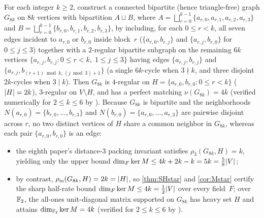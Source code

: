 \begin{remark}\label{rem:deg4-numerics}
For each integer $k \ge 2$, construct a connected bipartite (hence triangle-free) graph $G_{8k}$ on $8k$ vertices with
bipartition $A \sqcup B$, where $A = \bigsqcup_{r=0}^{k-1} \{a_{r,0}, a_{r,1}, a_{r,2}, a_{r,3}\}$ and
$B = \bigsqcup_{r=0}^{k-1} \{b_{r,0}, b_{r,1}, b_{r,2}, b_{r,3}\}$, by including, for each $0 \le r < k$, all seven edges
incident to $a_{r,0}$ or $b_{r,0}$ inside block~$r$ ($\{a_{r,0}, b_{r,j}\}$ and $\{a_{r,j}, b_{r,0}\}$ for $0 \le j \le 3$)
together with a $2$-regular bipartite subgraph on the remaining $6k$ vertices $\{a_{r,j}, b_{r,j} : 0 \le r < k,\; 1 \le j \le 3\}$
having edges $\{a_{r,j}, b_{r,j}\}$ and $\{a_{r,j}, b_{(r+1)\bmod k,\,(j\bmod 3)+1}\}$ (a single $6k$-cycle when $3 \nmid k$,
and three disjoint $2k$-cycles when $3 \mid k$). Then $G_{8k}$ is $4$-regular on $H = \{a_{r,0}, b_{r,0} : 0 \le r < k\}$
($\lvert H \rvert = 2k$), $3$-regular on $V \setminus H$, and has a perfect matching $\nu(G_{8k}) = 4k$ (verified numerically for
$2 \le k \le 6$ by ). Because $G_{8k}$ is bipartite and the neighborhoods
$N(a_{r,0}) = \{b_{r,0},\dots,b_{r,3}\}$ and $N(b_{r,0}) = \{a_{r,0},\dots,a_{r,3}\}$ are pairwise disjoint across $r$, no two
distinct vertices of $H$ share a common neighbor in $G_{8k}$, whereas each pair $\{a_{r,0}, b_{r,0}\}$ is an edge:
\begin{itemize}
\item the eighth paper's distance-$3$ packing invariant satisfies $\rho_3(G_{8k}, H) = k$, yielding only the upper bound
  $\dim_F \ker M \le 4k + 2k - k = 5k = \frac{5}{8}\lvert V \rvert$;
\item by contrast, $\rho_{\mathrm{m}}(G_{8k}, H) = 2k = \lvert H \rvert$, so \cref{thm:SHstar} and \cref{cor:Mstar} certify the sharp half-rate
  bound $\dim_F \ker M \le 4k = \frac{1}{2}\lvert V \rvert$ over every field~$F$; over $\mathbb{F}_2$, the all-ones unit-diagonal matrix
  supported on $G_{8k}$ has heavy set $H$ and attains $\dim_{\mathbb{F}_2} \ker M = 4k$ (verified for $2 \le k \le 6$ by
  ).
\end{itemize}
\end{remark}

